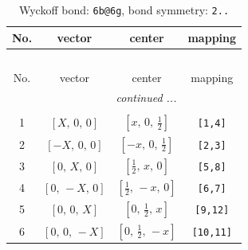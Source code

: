 \documentclass[fleqn,8pt]{jsarticle}
\begin{document}
\begin{longtable}{cccc}
\caption{Wyckoff bond: {\tt 6b@6g}, bond symmetry: {\tt 2..}}
 \\
 \hline \hline
No. & vector & center & mapping \\ \hline \endfirsthead

\multicolumn{3}{l}{\tablename\ \thetable{}} \\
 \hline \hline
No. & vector & center & mapping \\ \hline \endhead

 \hline \hline
\multicolumn{3}{r}{\footnotesize\it continued ...} \\ \endfoot

 \hline \hline
\multicolumn{3}{r}{} \\ \endlastfoot

1 & $\left[ X,\, 0,\, 0 \right]$ & $\left[ x,\, 0,\, \frac{1}{2} \right]$ & {\tt [1,4]} \\ \hline
2 & $\left[ - X,\, 0,\, 0 \right]$ & $\left[ - x,\, 0,\, \frac{1}{2} \right]$ & {\tt [2,3]} \\ \hline
3 & $\left[ 0,\, X,\, 0 \right]$ & $\left[ \frac{1}{2},\, x,\, 0 \right]$ & {\tt [5,8]} \\ \hline
4 & $\left[ 0,\, - X,\, 0 \right]$ & $\left[ \frac{1}{2},\, - x,\, 0 \right]$ & {\tt [6,7]} \\ \hline
5 & $\left[ 0,\, 0,\, X \right]$ & $\left[ 0,\, \frac{1}{2},\, x \right]$ & {\tt [9,12]} \\ \hline
6 & $\left[ 0,\, 0,\, - X \right]$ & $\left[ 0,\, \frac{1}{2},\, - x \right]$ & {\tt [10,11]} \\
\end{longtable}
\renewcommand{\arraystretch}{1.2}
\end{document}
